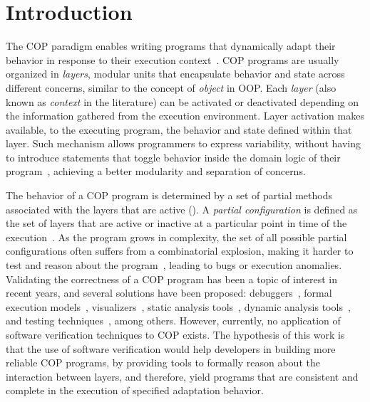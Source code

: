 
\section{Introduction}
\label{sec:introduction}

The \acf{COP} paradigm enables writing programs that dynamically adapt their behavior in response to 
their execution context~\cite{hirschfeld08cop,appeltauer09cop,salvaneschi12survey,mens16,alegre16,cardozo22,elyasaf23}. 
\ac{COP} programs are usually organized in \emph{layers}, modular units that encapsulate behavior 
and state across different concerns, similar to the concept of \emph{object} in \ac{OOP}. Each 
\emph{layer} (also known as \emph{context} in the literature) can be activated or deactivated depending 
on the information gathered from the execution environment. Layer activation makes available, to the 
executing program, the behavior and state defined within that layer. Such mechanism allows 
programmers to express variability, without having to introduce statements that toggle behavior inside 
the domain logic of their program~\cite{costanza05contextl}, achieving a better modularity and 
separation of concerns.

The behavior of a \ac{COP} program is determined by a set of partial methods associated with the 
layers that are active (). A \emph{partial configuration} is 
defined as the set of layers that are active or inactive at a particular point in time of the 
execution~\cite{martou24}. As the program grows in complexity, the set of all possible partial 
configurations often suffers from a combinatorial explosion, making it harder to test and reason about 
the program~\cite{martou24}, leading to bugs or execution anomalies.
Validating the correctness of a \ac{COP} program has been a topic of interest in recent years, 
and several solutions have been proposed: debuggers~\cite{uchio11}, formal 
execution models~\cite{cardozo15jist, taing16cop, cardozo18sefsas}, visualizers~\cite{duhoux18}, static 
analysis tools~\cite{cardenas23}, dynamic analysis tools~\cite{cardozo14cop}, and testing 
techniques~\cite{martou24}, among others. However, currently, no application of software verification 
techniques to \ac{COP} exists. The hypothesis of this work is that the use of software verification 
would help developers in building more reliable \ac{COP} programs, by providing 
tools to formally reason about the interaction between layers, and therefore, yield programs that are 
consistent and complete in the execution of specified adaptation behavior.

